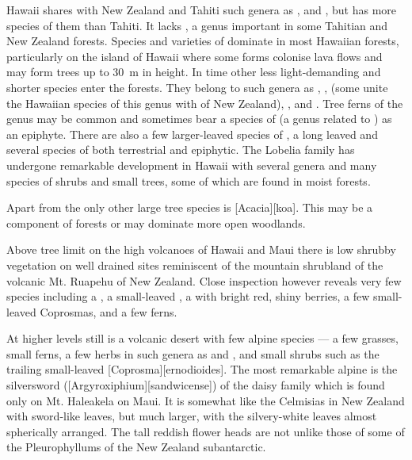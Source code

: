 Hawai{\okina}i shares with New Zealand and Tahiti such genera as ,  and , but has more species of them than Tahiti.
It lacks , a genus important in some Tahitian and New Zealand forests.
Species and varieties of  dominate in most Hawaiian forests, particularly on the island of Hawai{\okina}i where some forms colonise lava flows and may form trees up to \SI{30}{\metre} in height.
In time other less light-demanding and shorter species enter the forests.
They belong to such genera as , ,  (some unite the Hawaiian species of this genus with  of New Zealand), ,  and .
Tree ferns of the genus  may be common and sometimes bear a species of  (a genus related to ) as an epiphyte.
There are also a few larger-leaved species of , a long leaved  and several species of  both terrestrial and epiphytic.
The Lobelia family has undergone remarkable development in Hawai{\okina}i with several genera and many species of shrubs and small trees, some of which are found in moist forests.

Apart from  the only other large tree species is [Acacia][koa].
This may be a component of  forests or may dominate more open woodlands.

Above tree limit on the high volcanoes of Hawai{\okina}i and Maui there is low shrubby vegetation on well drained sites reminiscent of the mountain shrubland of the volcanic Mt. Ruapehu of New Zealand.
Close inspection however reveals very few species including a , a small-leaved , a  with bright red, shiny berries, a few small-leaved Coprosmas, and a few ferns.

At higher levels still is a volcanic desert with few alpine species --- a few grasses, small ferns, a few herbs in such genera as  and , and small shrubs such as the trailing small-leaved [Coprosma][ernodioides].
The most remarkable alpine is the silversword ([Argyroxiphium][sandwicense]) of the daisy family which is found only on Mt. Haleakela on Maui.
It is somewhat like the Celmisias in New Zealand with sword-like leaves, but much larger, with the silvery-white leaves almost spherically arranged.
The tall reddish flower heads are not unlike those of some of the Pleurophyllums of the New Zealand subantarctic.

